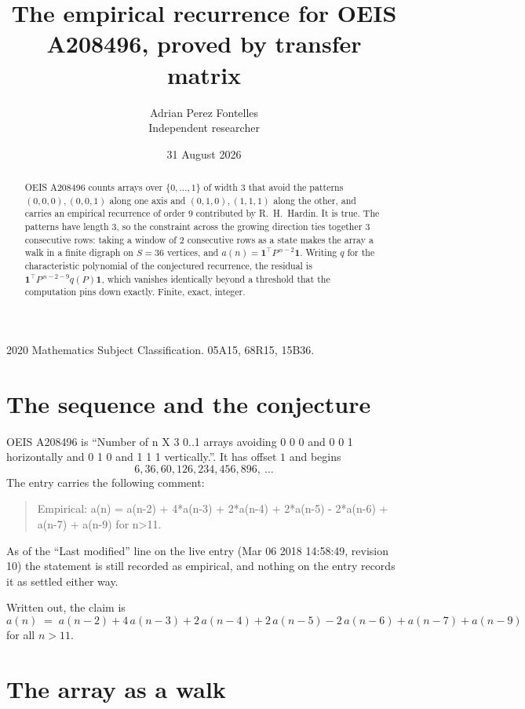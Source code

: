 \documentclass[11pt,a4paper]{article}
\title{The empirical recurrence for OEIS A208496, proved by transfer matrix}
\author{Adrian Perez Fontelles\\ \small Independent researcher}
\date{31 August 2026}
\theoremstyle{plain}
\theoremstyle{definition}
\begin{document}
\maketitle

\begin{abstract}
OEIS A208496 counts arrays over $\{0,\dots,1\}$ of width $3$ that avoid the patterns
$(0,0,0), (0,0,1)$ along one axis and $(0,1,0), (1,1,1)$ along the other, and carries an empirical recurrence of
order $9$ contributed by R.~H.~Hardin. It is true. The patterns have length $3$, so
the constraint across the growing direction ties together $3$ consecutive rows: taking a
window of $2$ consecutive rows as a state makes the array a walk in a finite digraph
on $S=36$ vertices, and $a(n)=\mathbf{1}^{\!\top}P^{\,n-2}\mathbf{1}$. Writing $q$
for the characteristic polynomial of the conjectured recurrence, the residual is
$\mathbf{1}^{\!\top}P^{\,n-2-9}q(P)\mathbf{1}$, which vanishes identically
beyond a threshold that the computation pins down exactly. Finite, exact, integer.
\end{abstract}

\noindent\small 2020 Mathematics Subject Classification. 05A15, 68R15, 15B36.\normalsize

\section{The sequence and the conjecture}

OEIS A208496 is ``Number of n X 3 0..1 arrays avoiding 0 0 0 and 0 0 1 horizontally and 0 1 0 and 1 1 1 vertically.''. It has offset
$1$ and begins
\[
6, 36, 60, 126, 234, 456, 896,\ \dots
\]
The entry carries the following comment:
\begin{quote}\small
Empirical: a(n) = a(n-2) + 4*a(n-3) + 2*a(n-4) + 2*a(n-5) - 2*a(n-6) + a(n-7) + a(n-9) for n>11.
\end{quote}
As of the ``Last modified'' line on the live entry (Mar 06 2018 14:58:49, revision
10) the statement is still recorded as empirical, and nothing on the entry
records it as settled either way.

Written out, the claim is
\begin{equation}\label{eq:conj}
a(n)\;=\;a(n-2) + 4\,a(n-3) + 2\,a(n-4) + 2\,a(n-5) - 2\,a(n-6) + a(n-7) + a(n-9)
\end{equation}
for all $n>11$. 

\section{The array as a walk}
\end{document}

